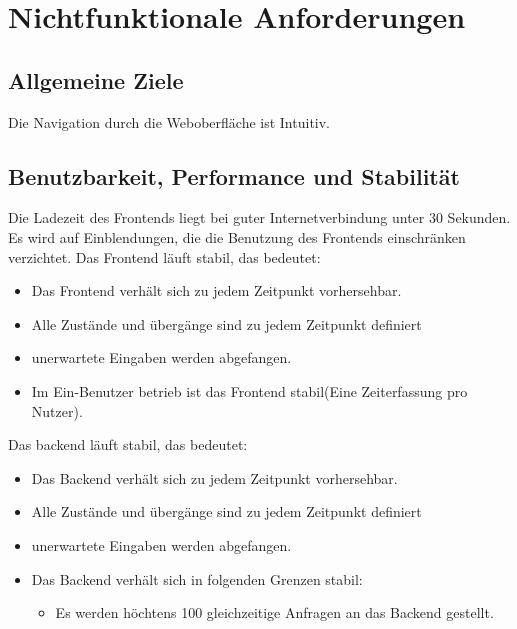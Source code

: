 \section{Nichtfunktionale Anforderungen}

\subsection{Allgemeine Ziele}
\begin{requirements}
     Die Navigation durch die Weboberfläche ist Intuitiv.
\end{requirements}

\subsection{Benutzbarkeit, Performance und Stabilität}
\begin{requirements}
     Die Ladezeit des Frontends liegt bei guter Internetverbindung unter 30 Sekunden.
     Es wird auf Einblendungen, die die Benutzung des Frontends einschränken verzichtet.
     Das Frontend läuft stabil, das bedeutet:
     \begin{itemize}
        \item Das Frontend verhält sich zu jedem Zeitpunkt vorhersehbar.
        \item Alle Zustände und übergänge sind zu jedem Zeitpunkt definiert
        \item unerwartete Eingaben werden abgefangen.
        \item Im Ein-Benutzer betrieb ist das Frontend stabil(Eine Zeiterfassung pro Nutzer).
     \end{itemize}
      Das backend läuft stabil, das bedeutet:
          \begin{itemize}
             \item Das Backend verhält sich zu jedem Zeitpunkt vorhersehbar.
             \item Alle Zustände und übergänge sind zu jedem Zeitpunkt definiert
             \item unerwartete Eingaben werden abgefangen.
             \item Das Backend verhält sich in folgenden Grenzen stabil:
                \begin{itemize}
                    \item Es werden höchtens 100 gleichzeitige Anfragen an das Backend gestellt.
                \end{itemize}
          \end{itemize}
\end{requirements}


